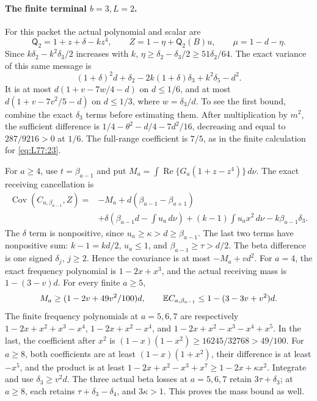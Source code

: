\paragraph{The finite terminal \(b=3,L=2\).}
For this packet the actual polynomial and scalar are
\[
 \mathsf Q_2=1+z+\delta-kz^4,\qquad
 Z=1-\eta+\mathsf Q_2(B)u,\qquad \mu=1-d-\eta.
\]
Since \(k\delta_2-k^2\delta_3/2\) increases with \(k\),
\(\eta\ge\delta_2-\delta_3/2\ge51\delta_2/64\).
The exact variance of this same message is
\[
 (1+\delta)^2d+\delta_2-2k(1+\delta)\delta_3
       +k^2\delta_5-d^2.
\]
It is at most \(d(1+v-7w/4-d)\) on \(d\le1/6\), and at
most \(d(1+v-7v^2/5-d)\) on \(d\le1/3\), where
\(w=\delta_3/d\). To see the first bound, combine the exact
\(\delta_3\) terms before estimating them. After multiplication
by \(m^2\), the sufficient difference is
\(1/4-\theta^2-d/4-7d^2/16\), decreasing and equal to
\(287/9216>0\) at \(1/6\). The full-range coefficient is
\(7/5\), as in the finite calculation for \eqref{eq:L77:23}.

For \(a\ge4\), use \(t=\beta_{a-1}\) and put
\(M_a=\int\operatorname{Re}\{G_a(1+z-z^4)\}\,d\nu\).
The exact receiving cancellation is
\begin{equation}\label{eq:q117-unified:retained-receiving-cancellation}
\begin{aligned}
 \operatorname{Cov}(C_{a,\beta_{a-1}},Z)
 ={}&-M_a+d(\beta_{a-1}-\beta_{a+1})\\
 &+\delta\left(\beta_{a-1}d-\int u_a\,d\nu\right)
 +(k-1)\int u_ax^2\,d\nu-k\beta_{a-1}\delta_3.
\end{aligned}
\end{equation}
The \(\delta\) term is nonpositive, since
\(u_a\ge\kappa>d\ge\beta_{a-1}\). The last two terms have
nonpositive sum: \(k-1=kd/2\), \(u_a\le1\), and
\(\beta_{a-1}\ge\tau>d/2\). The beta difference is one signed
\(\delta_j\), \(j\ge2\). Hence the covariance is at most
\(-M_a+vd^2\).
For \(a=4\), the exact frequency polynomial is
\(1-2x+x^3\), and the actual receiving mass is
\(1-(3-v)d\). For every finite \(a\ge5\),
\[
 M_a\ge(1-2v+49v^2/100)d,\qquad
 \mathbb E C_{a,\beta_{a-1}}\le1-(3-3v+v^2)d.
\]
The finite frequency polynomials at \(a=5,6,7\) are respectively
\(1-2x+x^2+x^3-x^4\),
\(1-2x+x^2-x^4\), and
\(1-2x+x^2-x^3-x^4+x^5\).
In the last, the coefficient after \(x^2\) is
\((1-x)(1-x^2)\ge16245/32768>49/100\).
For \(a\ge8\), both coefficients are at least
\((1-x)(1+x^2)\), their difference is at least \(-x^5\),
and the product is at least
\(1-2x+x^2-x^3+x^7\ge1-2x+\kappa x^2\).
Integrate and use \(\delta_3\ge v^2d\).
The three actual beta losses at \(a=5,6,7\) retain
\(3\tau+\delta_3\); at \(a\ge8\), each retains
\(\tau+\delta_3-\delta_4\), and \(3\kappa>1\).
This proves the mass bound as well.


